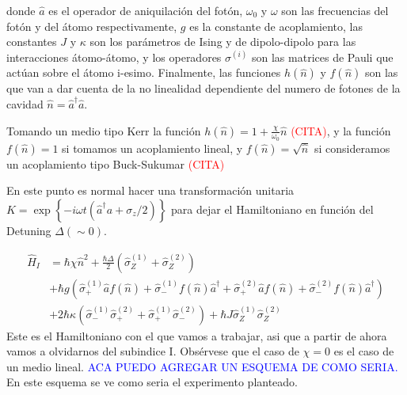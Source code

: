 donde $\hat a$ es el operador de aniquilaci\'on del fot\'on, $\omega_0$ y $\omega$ son las frecuencias del fot\'on y del átomo respectivamente, $g$ es la constante de acoplamiento, las constantes $J$ y $\kappa$ son los par\'ametros de Ising y de dipolo-dipolo para las interacciones átomo-átomo, y los operadores $\sigma^{(i)}$ son las matrices de Pauli que act\'uan sobre el átomo i-esimo. Finalmente, las funciones $h(\hat n)$ y $f(\hat n)$ son las que van a dar cuenta de la no linealidad dependiente del numero de fotones de la cavidad $\hat n = \hat a^\dagger \hat a$. 

Tomando un medio tipo Kerr la funci\'on $h(\hat n)=1+\frac{\chi}{\omega_0}\hat n$ \cite{}\textcolor{red}{(CITA)}, y la funci\'on $f(\hat n) =1$ si tomamos un acoplamiento lineal, y $f(\hat n) = \sqrt{\hat n}$ si consideramos un acoplamiento tipo Buck-Sukumar \cite{}\textcolor{red}{(CITA)}

En este punto es normal hacer una transformaci\'on unitaria  $K = \exp\left\{-i \omega t (\hat a^\dagger a + \sigma_z/2)\right\}$ para dejar el Hamiltoniano en funci\'on del Detuning $\Delta (\sim 0)$. 

\begin{equation}
\begin{split}
     \hat H_I & =\hbar \chi \hat n^2+\frac{\hbar \Delta}{2}(\hat\sigma_Z^{(1)}+\hat\sigma_Z^{(2)})   \\ 
     & + \hbar g(\hat\sigma_+^{(1)}\hat a f(\hat n)+\hat\sigma_-^{(1)}f(\hat n) \hat a^\dagger + \hat\sigma_+^{(2)}\hat a f(\hat n)+\hat\sigma_-^{(2)}f(\hat n) \hat a^\dagger) \\ 
 & + 2\hbar \kappa (\hat \sigma_-^{(1)}\hat \sigma_+^{(2)}+\hat \sigma_+^{(1)}\hat \sigma_-^{(2)}) + \hbar J \hat \sigma_Z^{(1)}\hat \sigma_Z^{(2)}
\end{split}
\end{equation}\label{eq4:H}
Este es el Hamiltoniano con el que vamos a trabajar, asi que a partir de ahora vamos a olvidarnos del subindice I. Obsérvese que el caso de $\chi=0$ es el caso de un medio lineal. 
\textcolor{blue}{ACA PUEDO AGREGAR UN ESQUEMA DE COMO SERIA.} En este esquema se ve como seria el experimento planteado. 

